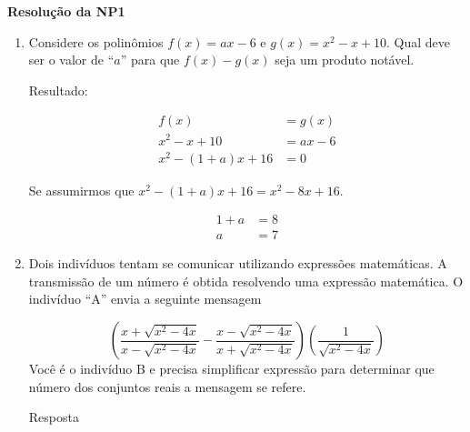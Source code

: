\documentclass[12pt,onepage,a4paper]{memoir}
\newcommand{\tit}{Resolução da NP1}
\begin{document}
\thispagestyle{1pagina}
\vspace*{2.5cm} %

\vspace{0.5cm}
\textbf{\textsf{\large \tit}} %



\begin{enumerate} %

 \item Considere os polinômios $f(x) = ax - 6$ e $g(x) = x^2 - x + 10$. Qual deve ser o valor de “$a$” para que
          $f(x) - g(x)$ seja um produto notável.

          Resultado:

       \begin{align*}
       f(x) &= g(x) \\
        x^2 - x + 10   & = ax - 6  \\
         x^2 -(1+a)x + 16 & = 0
      \end{align*}
      
      Se assumirmos que $x^2 -(1+a)x + 16 = x^2 -8x + 16$.

        \begin{align*}
          1+a &= 8 \\
          a & = 7
        \end{align*}
      


          \item  Dois indivíduos tentam se comunicar utilizando expressões matemáticas. A transmissão de um número é obtida resolvendo uma expressão matemática. O indivíduo “A” envia a seguinte mensagem 

\begin{equation}
  \left( \frac{x + \sqrt{x^2-4x}}{x - \sqrt{x^2-4x}}  - \frac{x - \sqrt{x^2-4x}}{x + \sqrt{x^2-4x}} \right)\left( \frac{1}{\sqrt{x^2-4x}}\right)
\end{equation}
Você é o indivíduo B e precisa simplificar expressão para determinar que número
dos conjuntos reais a mensagem se refere.

Resposta


\end{enumerate}
\end{document}
